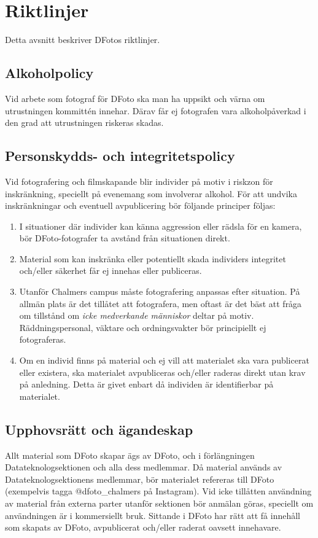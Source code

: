 \section{Riktlinjer}
Detta avsnitt beskriver DFotos riktlinjer.

\subsection{Alkoholpolicy}
Vid arbete som fotograf för DFoto ska man ha uppsikt och värna om utrustningen kommittén innehar. Därav får ej fotografen vara alkoholpåverkad i den grad att utrustningen riskeras skadas.  

\subsection{Personskydds- och integritetspolicy}
Vid fotografering och filmskapande blir individer på motiv i riskzon för inskränkning, speciellt på evenemang som involverar alkohol. För att undvika inskränkningar och eventuell avpublicering bör följande principer följas: 
\begin{enumerate}
    \item I situationer där individer kan känna aggression eller rädsla för en kamera, bör DFoto-fotografer ta avstånd från situationen direkt. 
    \item Material som kan inskränka eller potentiellt skada individers integritet och/eller säkerhet får ej innehas eller publiceras. 
    \item Utanför Chalmers campus måste fotografering anpassas efter situation. På allmän plats är det tillåtet att fotografera, men oftast är det bäst att fråga om tillstånd om \textit{icke medverkande människor} deltar på motiv. Räddningspersonal, väktare och ordningsvakter bör principiellt ej fotograferas. 
    \item Om en individ finns på material och ej vill att materialet ska vara publicerat eller existera, ska materialet avpubliceras och/eller raderas direkt utan krav på anledning. Detta är givet enbart då individen är identifierbar på materialet. 
\end{enumerate}

\subsection{Upphovsrätt och ägandeskap}
Allt material som DFoto skapar ägs av DFoto, och i förlängningen Datateknologsektionen och alla dess medlemmar. Då material används av Datateknologsektionens medlemmar, bör materialet refereras till DFoto (exempelvis tagga @dfoto\_chalmers på Instagram). Vid icke tillåtten användning av material från externa parter utanför sektionen bör anmälan göras, speciellt om användningen är i kommersiellt bruk. Sittande i DFoto har rätt att få innehåll som skapats av DFoto, avpublicerat och/eller raderat oavsett innehavare.  